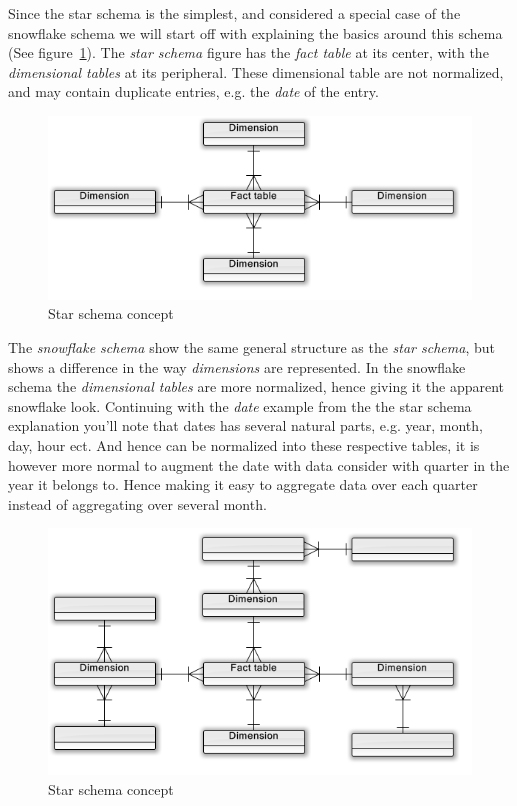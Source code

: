 	\bigskip\noindent
	Since the star schema is the simplest, and considered a special case of the snowflake schema
	we will start off with explaining the basics around this schema (See figure~\ref{fig:starSchemeConcept}). 
	The \textit{star schema} figure has the \textit{fact table} at its center, with the \textit{dimensional tables} at its peripheral. 
	These dimensional table are not normalized, and may contain duplicate entries, e.g. the \textit{date} of the entry.
		
	\begin{figure}[H]%
		\centering
		\includegraphics[width=\columnwidth]{UML/StarSchemaConcept.png}%
		\caption{Star schema concept}%
		\label{fig:starSchemeConcept}%
	\end{figure}
	
	\bigskip\noindent
	The \textit{snowflake schema} show the same general structure as the \textit{star schema}, 
	but shows a difference in the way \textit{dimensions} are represented. 
	In the snowflake schema the \textit{dimensional tables} are more normalized, hence giving it the apparent snowflake look.
	Continuing with the \textit{date}	example from the the star schema explanation you'll note that dates has several natural 
	parts, e.g. year, month, day, hour ect. And hence can be normalized into these respective tables, 
	it is however more normal to augment the date with data consider with quarter in the year it belongs to. 
	Hence making it easy to aggregate data over each quarter instead of aggregating over several month.
	
	\begin{figure}[H]%
		\centering
		\includegraphics[width=\columnwidth]{UML/SnowflakeSchemaConcept.png}%
		\caption{Star schema concept}%
		\label{fig:snowflakeSchemeConcept}%
	\end{figure}	
	

